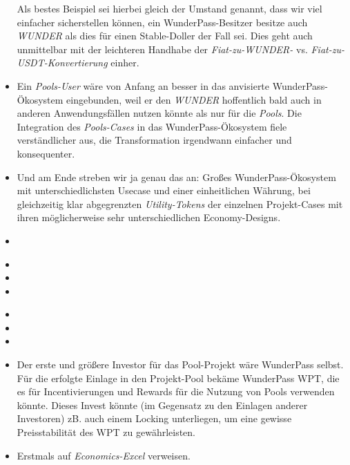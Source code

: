 \begin{Konzept}
\begin{itemize}
	Als bestes Beispiel sei hierbei gleich der Umstand genannt, dass wir viel einfacher sicherstellen können, ein WunderPass-Besitzer besitze auch \textit{WUNDER} als dies für einen Stable-Doller der Fall sei. Dies geht auch unmittelbar mit der leichteren Handhabe der \textit{Fiat-zu-WUNDER-} vs. \textit{Fiat-zu-USDT-Konvertierung} einher.
	\item Ein \textit{Pools-User} wäre von Anfang an besser in das anvisierte WunderPass-Ökosystem eingebunden, weil er den \textit{WUNDER} hoffentlich bald auch in anderen Anwendungsfällen nutzen könnte als nur für die \textit{Pools}. Die Integration des \textit{Pools-Cases} in das WunderPass-Ökosystem fiele verständlicher aus, die Transformation irgendwann einfacher und konsequenter.
	\item Und am Ende streben wir ja genau das an: Großes WunderPass-Ökosystem mit unterschiedlichsten Usecase und einer einheitlichen Währung, bei gleichzeitig klar abgegrenzten \textit{Utility-Tokens} der einzelnen Projekt-Cases mit ihren möglicherweise  sehr unterschiedlichen Economy-Designs.
	\item
\end{itemize}

\vspace{0.3cm}

\begin{itemize}
	\item 
	\item
	\item
\end{itemize}

\vspace{0.3cm}

\begin{itemize}
	\item 
	\item
	\item
\end{itemize}

\end{Konzept}


\vspace{0.3cm}

\begin{itemize}
	\item Der erste und größere Investor für das Pool-Projekt wäre WunderPass selbst. Für die erfolgte Einlage in den Projekt-Pool bekäme WunderPass WPT, die es für Incentivierungen und Rewards für die Nutzung von Pools verwenden könnte. Dieses Invest könnte (im Gegensatz zu den Einlagen anderer Investoren) zB. auch einem Locking unterliegen, um eine gewisse Preisstabilität des WPT zu gewährleisten.	
	\item Erstmals auf \textit{Economics-Excel} verweisen.
\end{itemize}
